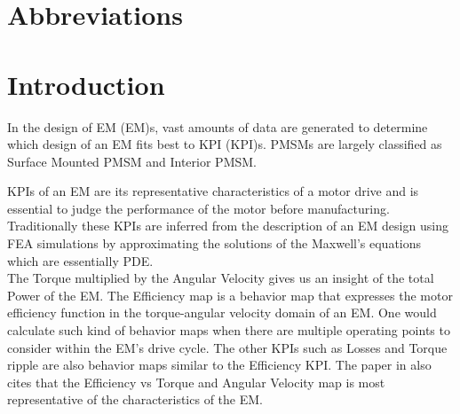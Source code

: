 \documentclass{report} %
\begin{document}
\newpage

\newpage

\begin{spacing}{1.2}
    \tableofcontents
\end{spacing}

\newpage

\newpage

\chapter*{Abbreviations}
\begin{acronym}[TDMA]
  

\end{acronym}

\newpage

\newpage

\chapter{Introduction} 
In the design of \acl{EM} (\ac{EM})s, vast amounts of data are generated to determine which design of an \ac{EM} fits best to \acl{KPI} (\ac{KPI})s.
\ac{PMSM}s are largely classified as Surface Mounted \ac{PMSM} and Interior \ac{PMSM}.

\ac{KPI}s of an \ac{EM} are its representative characteristics of a motor drive and is essential to judge the performance of the motor before manufacturing.
Traditionally these \ac{KPI}s are inferred from the description of an \ac{EM} design using \ac{FEA} simulations by approximating the solutions of the Maxwell's equations which are essentially \ac{PDE}. \\
The Torque multiplied by the Angular Velocity gives us an insight of the total Power of the \ac{EM}.
The Efficiency map is a behavior map that expresses the motor efficiency function in the torque-angular velocity domain of an \ac{EM}.
One would calculate such kind of behavior maps when there are multiple operating points to consider within the \ac{EM}'s drive cycle.
The other \ac{KPI}s such as Losses and Torque ripple are also behavior maps similar to the Efficiency \ac{KPI}.
The paper in \cite{ETA-2021} also cites that the Efficiency vs Torque and Angular Velocity map is most representative of the characteristics of the \ac{EM}. 
\end{document}
